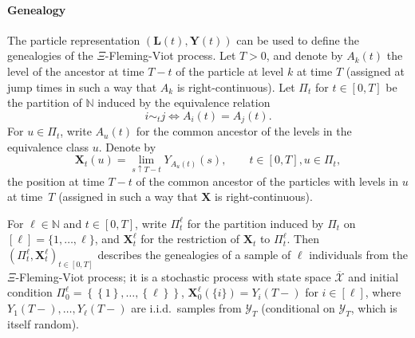 \documentclass[reqno,draft]{amsart}
\numberwithin{equation}{section}
\theoremstyle{plain}
\theoremstyle{remark}
\newcommand{\N}{\mathbb{N}} %
\newcommand{\fpart}{\Pi} %
\begin{document}
\medskip\paragraph{\textbf{Genealogy}} The particle representation $(\boldsymbol L(t), \boldsymbol Y(t))$ can be used to define the genealogies of the $\Xi$-Fleming-Viot process. Let $T > 0$, and denote by $A_k(t)$ the level of the ancestor at time $T-t$ of the particle at level $k$ at time $T$ (assigned at jump times in such a way that $A_k$ is right-continuous). Let $\fpart_t$ for $t\in [0,T]$ be the partition of $\N$ induced by the equivalence relation \[
    i \sim_t j \iff A_i(t) = A_j(t).
\]
For $u\in\fpart_t$, write $A_u(t)$ for the common ancestor of the levels in the equivalence class $u$.
Denote by
\begin{equation}\label{eq:xfromy}
    \boldsymbol X_t(u)
    = \lim_{s \uparrow T-t} Y_{A_u(t)}(s),\qquad t \in [0,T], u\in \fpart_t,
\end{equation}
the position at time $T-t$ of the common ancestor of the particles with levels in $u$ at time~$T$ (assigned in such a way that $\boldsymbol X$ is right-continuous).

For $\ell\in \N$ and $t \in [0,T]$, write $\fpart_t^\ell$ for the partition induced by $\fpart_t$ on $[\ell] = \{1, \ldots ,\ell\}$, and $\boldsymbol X_t^\ell$ for the restriction of $\boldsymbol X_t$ to $\fpart_t^\ell$. Then $(\fpart^\ell_t,\boldsymbol X^\ell_t)_{t \in [0,T]}$ describes the genealogies of a sample of $\ell$ individuals from the $\Xi$-Fleming-Viot process; it is a stochastic process with state space $\overline{\mathcal{X}}$ and initial condition $\fpart_0^\ell = \left\{ \left\{ 1 \right\} , \ldots ,\left\{ \ell \right\}  \right\} $, $\boldsymbol X_0^\ell(\{i\}) = Y_i(T-)$ for $i\in [\ell]$, where $Y_1(T-), \ldots ,Y_\ell(T-)$ are i.i.d.\ samples from $\mathcal{Y}_T$ (conditional on $\mathcal{Y}_T$, which is itself random).
\end{document}
